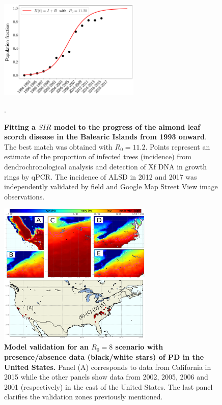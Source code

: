 \begin{figure}[H]
    \centering
    \includegraphics[width=0.6\textwidth]{Figures/R0_xylella.png}
    \caption{\textbf{Fitting a $SIR$ model to the progress of the almond
            leaf scorch disease in the Balearic Islands from 1993 onward}. The
        best match
        was obtained with $R_0= 11.2$. Points represent an estimate of the
        proportion
        of infected trees (incidence) from dendrochronological analysis and
        detection
        of Xf DNA in growth rings by qPCR. The incidence of ALSD in 2012 and
        2017 was
        independently validated by field and Google Map Street View image
        observations.}.
    \label{fig:sup_R0_Europe} %
\end{figure}

\begin{figure}[H]
    \centering
    \includegraphics[width=0.65\textwidth]{Figures/validation.png}
    \caption{\textbf{Model validation for an $R_0=8$ scenario with
            presence/absence data (black/white stars) of PD in the United
            States.} Panel
        (A) corresponds to data from California in 2015 while the other panels
        show
        data from 2002, 2005, 2006 and 2001 (respectively) in the east of the
        United
        States. The last panel clarifies the validation zones previously
        mentioned.}
    \label{fig:sup_validation} %
\end{figure}

